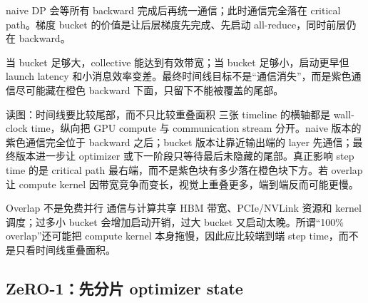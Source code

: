 
naive DP 会等所有 backward 完成后再统一通信；此时通信完全落在 critical path。梯度 bucket 的价值是让后层梯度先完成、先启动 all-reduce，同时前层仍在 backward。



当 bucket 足够大，collective 能达到有效带宽；当 bucket 足够小，启动更早但 launch latency 和小消息效率变差。最终时间线目标不是“通信消失”，而是紫色通信尽可能藏在橙色 backward 下面，只留下不能被覆盖的尾部。


\begin{knowledgebox}{读图：时间线要比较尾部，而不只比较重叠面积}
三张 timeline 的横轴都是 wall-clock time，纵向把 GPU compute 与 communication stream 分开。naive 版本的紫色通信完全位于 backward 之后；bucket 版本让靠近输出端的 layer 先通信；最终版本进一步让 optimizer 或下一阶段只等待最后未隐藏的尾部。真正影响 step time 的是 critical path 最右端，而不是紫色块有多少落在橙色块下方。若 overlap 让 compute kernel 因带宽竞争而变长，视觉上重叠更多，端到端反而可能更慢。
\end{knowledgebox}



\begin{warningbox}{Overlap 不是免费并行}
通信与计算共享 HBM 带宽、PCIe/NVLink 资源和 kernel 调度；过多小 bucket 会增加启动开销，过大 bucket 又启动太晚。所谓“100\% overlap”还可能把 compute kernel 本身拖慢，因此应比较端到端 step time，而不是只看时间线重叠面积。
\end{warningbox}

\subsection{ZeRO-1：先分片 optimizer state}

